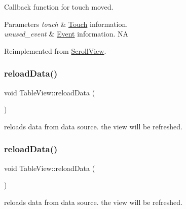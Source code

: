Callback function for touch moved.


\begin{DoxyParams}{Parameters}
{\em touch} & \hyperlink{classTouch}{Touch} information. \\
\hline
{\em unused\+\_\+event} & \hyperlink{classEvent}{Event} information.  NA \\
\hline
\end{DoxyParams}


Reimplemented from \hyperlink{classScrollView_a0958fd1a06430212b3d3cbe26ce2bb9c}{Scroll\+View}.

\mbox{\label{classTableView_ad142e6fbf0bf66d2d27fdb616a8a726c}} 
\subsubsection{\texorpdfstring{reload\+Data()}{reloadData()}\hspace{0.1cm}{\footnotesize\ttfamily [1/2]}}
{\footnotesize\ttfamily void Table\+View\+::reload\+Data (\begin{DoxyParamCaption}{ }\end{DoxyParamCaption})}

reloads data from data source. the view will be refreshed. \mbox{\label{classTableView_ad142e6fbf0bf66d2d27fdb616a8a726c}} 
\subsubsection{\texorpdfstring{reload\+Data()}{reloadData()}\hspace{0.1cm}{\footnotesize\ttfamily [2/2]}}
{\footnotesize\ttfamily void Table\+View\+::reload\+Data (\begin{DoxyParamCaption}{ }\end{DoxyParamCaption})}

reloads data from data source. the view will be refreshed. \mbox{\label{classTableView_afaef50b9df2cc2c3d34bb157d046f73f}} 
